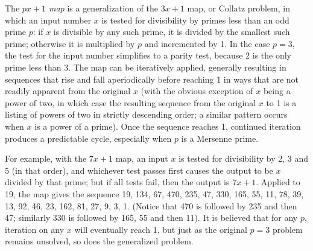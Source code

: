 \documentclass[12pt]{article}
\begin{document}
The {\em $px + 1$ map} is a generalization of the $3x + 1$ map, or Collatz problem, in which an input number $x$ is tested for divisibility by primes less than an odd prime $p$: if $x$ is divisible by any such prime, it is divided by the smallest such prime; otherwise it is multiplied by $p$ and incremented by 1. In the case $p = 3$, the test for the input number simplifies to a parity test, because 2 is the only prime less than 3. The map can be iteratively applied, generally resulting in sequences that rise and fall aperiodically before reaching 1 in ways that are not readily apparent from the original $x$ (with the obvious exception of $x$ being a power of two, in which case the resulting sequence from the original $x$ to 1 is a listing of powers of two in strictly descending order; a similar pattern occurs when $x$ is a power of a prime). Once the sequence reaches 1, continued iteration produces a predictable cycle, especially when $p$ is a Mersenne prime.

For example, with the $7x + 1$ map, an input $x$ is tested for divisibility by 2, 3 and 5 (in that order), and whichever test passes first causes the output to be $x$ divided by that prime; but if all tests fail, then the output is $7x + 1$. Applied to 19, the map gives the sequence 19, 134, 67, 470, 235, 47, 330, 165, 55, 11, 78, 39, 13, 92, 46, 23, 162, 81, 27, 9, 3, 1. (Notice that 470 is followed by 235 and then 47; similarly 330 is followed by 165, 55 and then 11). It is believed that for any $p$, iteration on any $x$ will eventually reach 1, but just as the original $p = 3$ problem remains unsolved, so does the generalized problem.
\end{document}
